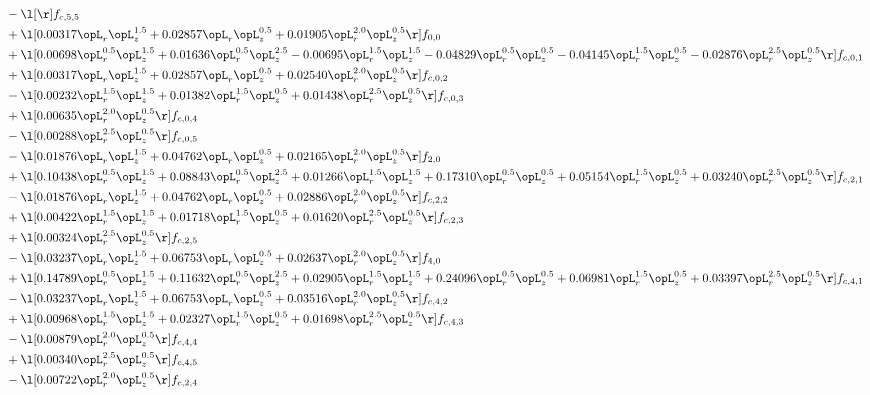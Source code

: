 \begin{alignat}{2}
& - \l[  \r] f_{c,5,5} \nonumber \\ 
& + \l[  0.00317 \opL_r \opL_z^{1.5} +  0.02857 \opL_r \opL_z^{0.5} +  0.01905 \opL_r^{2.0} \opL_z^{0.5}  \r] f_{0,0} \nonumber \\ 
& + \l[  0.00698 \opL_r^{0.5} \opL_z^{1.5} +  0.01636 \opL_r^{0.5} \opL_z^{2.5}   -0.00695 \opL_r^{1.5} \opL_z^{1.5}   -0.04829 \opL_r^{0.5} \opL_z^{0.5}   -0.04145 \opL_r^{1.5} \opL_z^{0.5}   -0.02876 \opL_r^{2.5} \opL_z^{0.5}  \r] f_{c,0,1} \nonumber \\ 
& + \l[  0.00317 \opL_r \opL_z^{1.5} +  0.02857 \opL_r \opL_z^{0.5} +  0.02540 \opL_r^{2.0} \opL_z^{0.5}  \r] f_{c,0,2} \nonumber \\ 
& - \l[  0.00232 \opL_r^{1.5} \opL_z^{1.5} +  0.01382 \opL_r^{1.5} \opL_z^{0.5} +  0.01438 \opL_r^{2.5} \opL_z^{0.5}  \r] f_{c,0,3} \nonumber \\ 
& + \l[  0.00635 \opL_r^{2.0} \opL_z^{0.5}  \r] f_{c,0,4} \nonumber \\ 
& - \l[  0.00288 \opL_r^{2.5} \opL_z^{0.5}  \r] f_{c,0,5} \nonumber \\ 
& - \l[  0.01876 \opL_r \opL_z^{1.5} +  0.04762 \opL_r \opL_z^{0.5} +  0.02165 \opL_r^{2.0} \opL_z^{0.5}  \r] f_{2,0} \nonumber \\ 
& + \l[  0.10438 \opL_r^{0.5} \opL_z^{1.5} +  0.08843 \opL_r^{0.5} \opL_z^{2.5} +  0.01266 \opL_r^{1.5} \opL_z^{1.5} +  0.17310 \opL_r^{0.5} \opL_z^{0.5} +  0.05154 \opL_r^{1.5} \opL_z^{0.5} +  0.03240 \opL_r^{2.5} \opL_z^{0.5}  \r] f_{c,2,1} \nonumber \\ 
& - \l[  0.01876 \opL_r \opL_z^{1.5} +  0.04762 \opL_r \opL_z^{0.5} +  0.02886 \opL_r^{2.0} \opL_z^{0.5}  \r] f_{c,2,2} \nonumber \\ 
& + \l[  0.00422 \opL_r^{1.5} \opL_z^{1.5} +  0.01718 \opL_r^{1.5} \opL_z^{0.5} +  0.01620 \opL_r^{2.5} \opL_z^{0.5}  \r] f_{c,2,3} \nonumber \\ 
& + \l[  0.00324 \opL_r^{2.5} \opL_z^{0.5}  \r] f_{c,2,5} \nonumber \\ 
& - \l[  0.03237 \opL_r \opL_z^{1.5} +  0.06753 \opL_r \opL_z^{0.5} +  0.02637 \opL_r^{2.0} \opL_z^{0.5}  \r] f_{4,0} \nonumber \\ 
& + \l[  0.14789 \opL_r^{0.5} \opL_z^{1.5} +  0.11632 \opL_r^{0.5} \opL_z^{2.5} +  0.02905 \opL_r^{1.5} \opL_z^{1.5} +  0.24096 \opL_r^{0.5} \opL_z^{0.5} +  0.06981 \opL_r^{1.5} \opL_z^{0.5} +  0.03397 \opL_r^{2.5} \opL_z^{0.5}  \r] f_{c,4,1} \nonumber \\ 
& - \l[  0.03237 \opL_r \opL_z^{1.5} +  0.06753 \opL_r \opL_z^{0.5} +  0.03516 \opL_r^{2.0} \opL_z^{0.5}  \r] f_{c,4,2} \nonumber \\ 
& + \l[  0.00968 \opL_r^{1.5} \opL_z^{1.5} +  0.02327 \opL_r^{1.5} \opL_z^{0.5} +  0.01698 \opL_r^{2.5} \opL_z^{0.5}  \r] f_{c,4,3} \nonumber \\ 
& - \l[  0.00879 \opL_r^{2.0} \opL_z^{0.5}  \r] f_{c,4,4} \nonumber \\ 
& + \l[  0.00340 \opL_r^{2.5} \opL_z^{0.5}  \r] f_{c,4,5} \nonumber \\ 
& - \l[  0.00722 \opL_r^{2.0} \opL_z^{0.5}  \r] f_{c,2,4} \nonumber \\ 
\end{alignat} 


